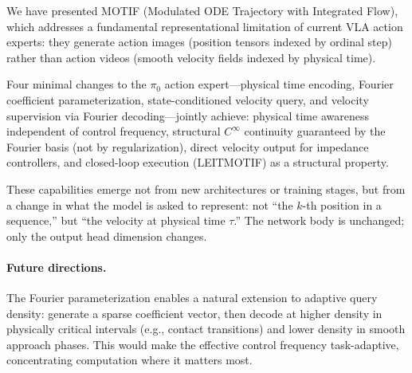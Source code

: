 \documentclass[11pt]{article}
\theoremstyle{plain}
\theoremstyle{definition}
\newcommand{\texec}{\tau}
\begin{document}
We have presented MOTIF (Modulated ODE Trajectory with Integrated Flow),
which addresses a fundamental representational limitation of current VLA
action experts: they generate action images (position tensors indexed by
ordinal step) rather than action videos (smooth velocity fields indexed
by physical time).

Four minimal changes to the $\pi_0$ action expert---physical time
encoding, Fourier coefficient parameterization, state-conditioned
velocity query, and velocity supervision via Fourier decoding---jointly
achieve: physical time awareness independent of control frequency,
structural $C^\infty$ continuity guaranteed by the Fourier basis (not
by regularization), direct velocity output for impedance controllers,
and closed-loop execution (LEITMOTIF) as a structural property.

These capabilities emerge not from new architectures or training stages,
but from a change in what the model is asked to represent: not
``the $k$-th position in a sequence,'' but ``the velocity at physical
time $\texec$.''
The network body is unchanged; only the output head dimension changes.

\paragraph{Future directions.}
The Fourier parameterization enables a natural extension to adaptive
query density: generate a sparse coefficient vector, then decode at
higher density in physically critical intervals (e.g., contact transitions)
and lower density in smooth approach phases.
This would make the effective control frequency task-adaptive, concentrating
computation where it matters most.
\end{document}
